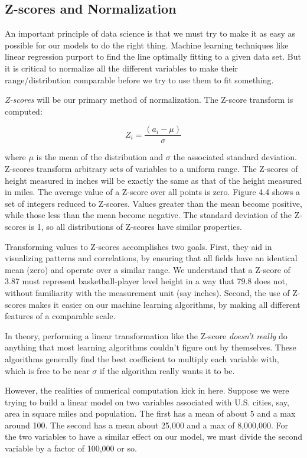\documentclass[10pt]{article}
\begin{document}
\subsection{Z-scores and Normalization}
An important principle of data science is that we must try to make it as easy as possible for our models to do the right thing. Machine learning techniques like linear regression purport to find the line optimally fitting to a given data set. But it is critical to normalize all the different variables to make their range/distribution comparable before we try to use them to fit something.

\textit{Z-scores} will be our primary method of normalization. The Z-score transform is computed:

\[
Z_{i}=\frac{(a_{i}-\mu)}{\sigma}
\]

where $\mu$ is the mean of the distribution and $\sigma$ the associated standard deviation.\\
Z-scores transform arbitrary sets of variables to a uniform range. The Z-scores of height measured in inches will be exactly the same as that of the height measured in miles. The average value of a Z-score over all points is zero. Figure 4.4 shows a set of integers reduced to Z-scores. Values greater than the mean become positive, while those less than the mean become negative. The standard deviation of the Z-scores is 1, so all distributions of Z-scores have similar properties.

Transforming values to Z-scores accomplishes two goals. First, they aid in visualizing patterns and correlations, by ensuring that all fields have an identical mean (zero) and operate over a similar range. We understand that a Z-score of 3.87 must represent basketball-player level height in a way that 79.8 does not, without familiarity with the measurement unit (say inches). Second, the use of Z-scores makes it easier on our machine learning algorithms, by making all different features of a comparable scale.

In theory, performing a linear transformation like the Z-score \textit{doesn't really} do anything that most learning algorithms couldn't figure out by themselves. These algorithms generally find the best coefficient to multiply each variable with, which is free to be near $\sigma$ if the algorithm really wants it to be.

However, the realities of numerical computation kick in here. Suppose we were trying to build a linear model on two variables associated with U.S. cities, say, area in square miles and population. The first has a mean of about 5 and a max around 100. The second has a mean about 25,000 and a max of 8,000,000. For the two variables to have a similar effect on our model, we must divide the second variable by a factor of 100,000 or so.
\end{document}
